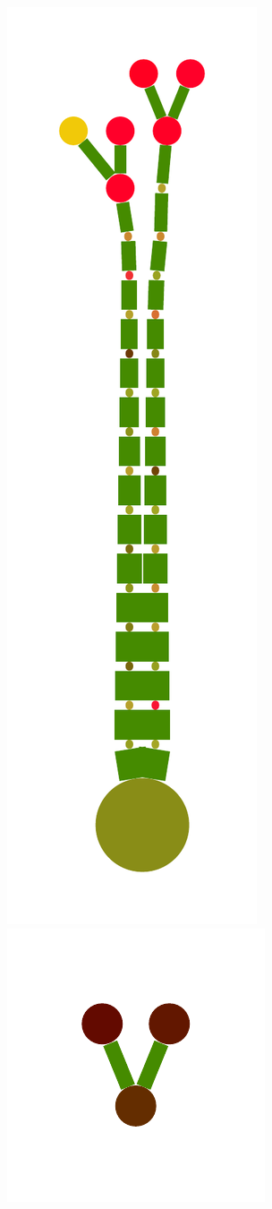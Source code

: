 \documentclass[a4paper,10pt]{article}
\begin{document}
\begin{figure}
{    \includegraphics[scale=.16]{./figures/6-5-tree-data-2.pdf}
    \includegraphics[scale=.16]{./figures/6-5-tree-data-3.pdf}
}
\end{figure}
\end{document}
